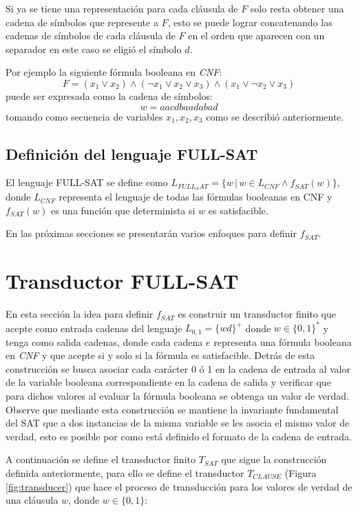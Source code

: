 Si ya se tiene una representación para cada cláusula de $F$ solo resta obtener una cadena de símbolos que represente a $F$,
esto se puede lograr concatenando las cadenas de símbolos de cada cláusula de $F$ en el orden que aparecen con un separador
en este caso se eligió el símbolo $d$.

Por ejemplo la siguiente fórmula booleana en \textit{CNF}:
$$F=(x_1 \vee x_2) \wedge (\neg x_1 \vee x_2 \vee x_3) \wedge (x_1 \vee \neg x_2 \vee x_3)$$
puede ser expresada como la cadena de símbolos:
$$w=aacdbaadabad$$
tomando como secuencia de variables $x_1, x_2, x_3$ como se describió anteriormente.

\subsection{Definición del lenguaje FULL-SAT}

El lenguaje FULL-SAT se define como $L_{FULL_SAT}=\{w\,|\,w \in L_{CNF} \wedge f_{SAT}(w)\}$, donde $L_{CNF}$ representa el lenguaje
de todas las fórmulas booleanas en CNF y $f_{SAT}(w)$ es una función que determinista si $w$ es satisfacible.

En las próximas secciones se presentarán varios enfoques para definir $f_{SAT}$.

\section{Transductor FULL-SAT}

En esta sección la idea para definir $f_{SAT}$ es construir un transductor finito que acepte como entrada cadenas del lenguaje $L_{0,1}=\{wd\}^+$ donde $w\in \{0,1\}^*$
y tenga como salida cadenas, donde cada cadena $e$ representa una fórmula booleana en \textit{CNF} y que acepte si y solo si la fórmula es satisfacible. Detrás
de esta construcción se busca asociar cada carácter 0 ó 1 en la cadena de entrada al valor de la variable booleana correspondiente en la cadena de salida y verificar que para dichos
valores al evaluar la fórmula booleana se obtenga un valor de verdad. Observe que mediante esta construcción se mantiene la invariante fundamental del SAT que a dos instancias
de la misma variable se les asocia el mismo valor de verdad, esto es posible por como está definido el formato de la cadena de entrada.

A continuación se define el transductor finito $T_{SAT}$ que sigue la construcción definida anteriormente, para ello se define
el transductor $T_{CLAUSE}$ (Figura \ref{fig:transducer}) que hace el proceso de transducción para los valores de verdad de una cláusula $w$, donde $w\in \{0,1\}$:

